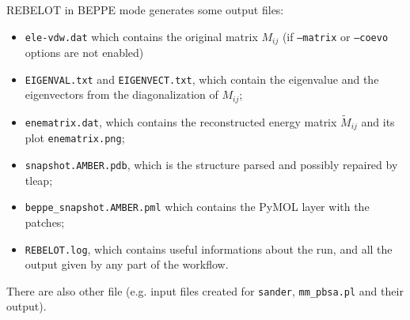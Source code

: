 \documentclass[a4paper,12pt]{book}
\begin{document}
REBELOT in BEPPE mode generates some output files:
\begin{itemize}
	\item \texttt{ele-vdw.dat} which contains the original matrix $M_{ij}$ (if \texttt{--matrix} or \texttt{--coevo} options are not enabled)
	\item \texttt{EIGENVAL.txt} and \texttt{EIGENVECT.txt}, which contain the eigenvalue and the eigenvectors from the diagonalization of $M_{ij}$;
	\item \texttt{enematrix.dat}, which contains the reconstructed energy matrix $\tilde{M}_{ij}$ and its plot \texttt{enematrix.png};
	\item \texttt{snapshot.AMBER.pdb}, which is the structure parsed and possibly repaired by tleap;
	\item \texttt{beppe\_snapshot.AMBER.pml} which contains the PyMOL layer with the patches;
	\item \texttt{REBELOT.log}, which contains useful informations about the run, and all the output given by any part of the workflow.
\end{itemize}
There are also other file (e.g. input files created for \texttt{sander}, \texttt{mm\_pbsa.pl} and their output).
\end{document}
